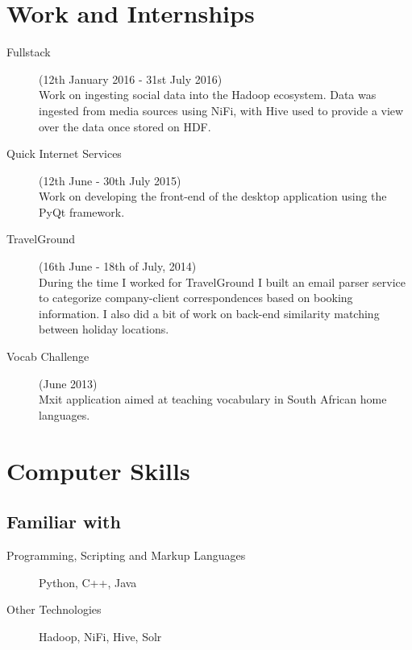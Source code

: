 \documentclass[margin,line,a4paper]{resume}
\begin{document}
\begin{resume}
        \section{\mysidestyle Work and Internships}
            \begin{description}
                \item[Fullstack] (12th January 2016 - 31st July 2016) \\
                    Work on ingesting social data into the Hadoop ecosystem. Data was ingested from media sources using NiFi, with Hive used to provide a view over the data once stored on HDF.

                \item[Quick Internet Services] (12th June - 30th July 2015) \\
                    Work on developing the front-end of the desktop application using the PyQt framework.

                \item[TravelGround] (16th June - 18th of July, 2014) \\
                    During the time I worked for TravelGround I built an email parser service to categorize company-client correspondences based on booking information. I also did a bit of work on back-end similarity matching between holiday locations.

                \item[Vocab Challenge] (June 2013) \\
                    Mxit application aimed at teaching vocabulary in South African home languages.

            \end{description}

        \section{\mysidestyle Computer Skills}
        \subsection{\mysidestyle Familiar with}
            \begin{description}
                \item [Programming, Scripting and Markup Languages] Python, C++, Java
                \item [Other Technologies] Hadoop, NiFi, Hive, Solr
            \end{description}


\end{resume}
\end{document}
